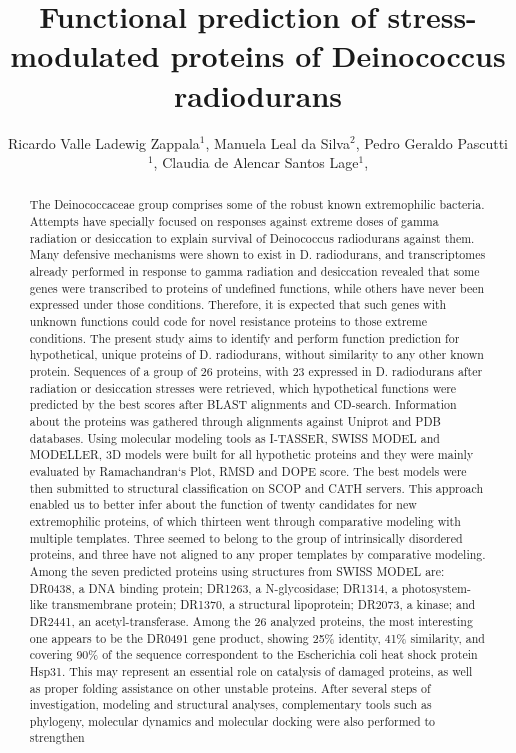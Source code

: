 \documentclass[twoside]{article}
\title{\vspace{-15mm}\fontsize{24pt}{10pt}\selectfont\textbf{ Functional prediction of stress-modulated proteins of Deinococcus radiodurans }} %
\author{ Ricardo Valle Ladewig Zappala$^{1}$, Manuela Leal da Silva$^{2}$, Pedro Geraldo Pascutti$^{1}$, Claudia de Alencar Santos Lage$^{1}$, }
\affil{ 1 Universidade Federal do Rio de Janeiro

2 Instituto Nacional de Metrologia Qualidade e Tecnologia

 }
\date{}
\begin{document}
  
  
  \maketitle %
  
  
  \thispagestyle{fancy} %
  
  
  \begin{abstract}
  The Deinococcaceae group comprises some of the robust known extremophilic bacteria. Attempts have specially focused on responses against extreme doses of gamma radiation or desiccation to explain survival of Deinococcus radiodurans against them. Many defensive mechanisms were shown to exist in D. radiodurans, and transcriptomes already performed in response to gamma radiation and desiccation revealed that some genes were transcribed to proteins of undefined functions, while others have never been expressed under those conditions. Therefore, it is expected that such genes with unknown functions could code for novel resistance proteins to those extreme conditions. The present study aims to identify and perform function prediction for hypothetical, unique proteins of D. radiodurans, without similarity to any other known protein. Sequences of a group of 26 proteins, with 23 expressed in D. radiodurans after radiation or desiccation stresses were retrieved, which hypothetical functions were predicted by the best scores after BLAST alignments and CD-search. Information about the proteins was gathered through alignments against Uniprot and PDB databases. Using molecular modeling tools as I-TASSER, SWISS MODEL and MODELLER, 3D models were built for all hypothetic proteins and they were mainly evaluated by Ramachandran‘s Plot, RMSD and DOPE score. The best models were then submitted to structural classification on SCOP and CATH servers. This approach enabled us to better infer about the function of twenty candidates for new extremophilic proteins, of which thirteen went through comparative modeling with multiple templates. Three seemed to belong to the group of intrinsically disordered proteins, and three have not aligned to any proper templates by comparative modeling. Among the seven predicted proteins using structures from SWISS MODEL are: DR0438, a DNA binding protein; DR1263, a N-glycosidase; DR1314, a photosystem-like transmembrane protein; DR1370, a structural lipoprotein; DR2073, a kinase; and DR2441, an acetyl-transferase. Among the 26 analyzed proteins, the most interesting one appears to be the DR0491 gene product, showing 25\% identity, 41\% similarity, and covering 90\% of the sequence correspondent to the Escherichia coli heat shock protein Hsp31. This may represent an essential role on catalysis of damaged proteins, as well as proper folding assistance on other unstable proteins. After several steps of investigation, modeling and structural analyses, complementary tools such as phylogeny, molecular dynamics and molecular docking were also performed to strengthen 
\end{abstract}
\end{document}
